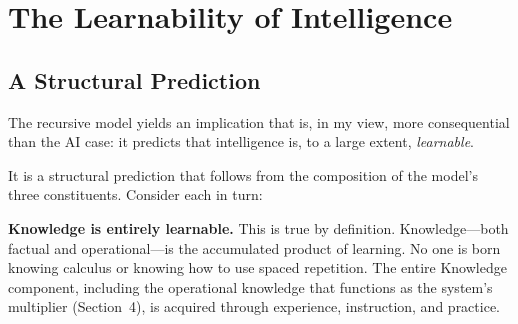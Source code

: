 \documentclass[12pt,a4paper]{article}
\begin{document}
\section{The Learnability of Intelligence}

\subsection{A Structural Prediction}

The recursive model yields an implication that is, in my view, more consequential than the AI case: it predicts that intelligence is, to a large extent, \emph{learnable}.

It is a structural prediction that follows from the composition of the model's three constituents. Consider each in turn:

\textbf{Knowledge is entirely learnable.} This is true by definition. Knowledge---\hspace{0pt}both factual and operational---\hspace{0pt}is the accumulated product of learning. No one is born knowing calculus or knowing how to use spaced repetition. The entire Knowledge component, including the operational knowledge that functions as the system's multiplier (Section~4), is acquired through experience, instruction, and practice.
\end{document}
